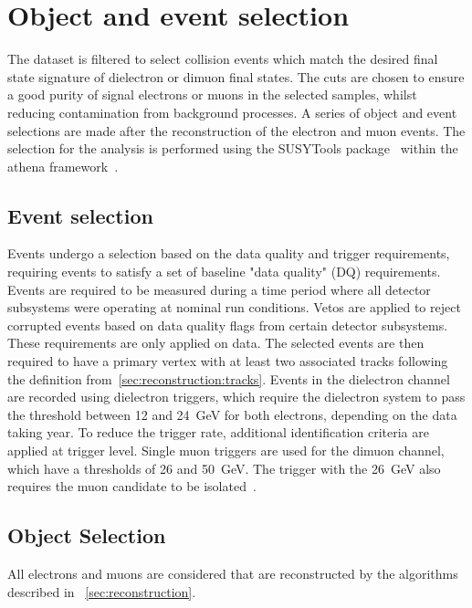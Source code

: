 \chapter{Object and event selection}\label{chap:eventsel}
The dataset is filtered to select collision events which match the desired final state signature of dielectron or dimuon final states. The cuts are chosen to ensure a good purity of signal electrons or muons in the selected samples, whilst reducing contamination from background processes. A series of object and event selections are made after the reconstruction of the electron and muon events. The selection for the analysis is performed using the SUSYTools package~\cite{SUSYTools} within the athena framework~\cite{Athena}.

\section{Event selection}\label{sec:selevent}
Events undergo a selection based on the data quality and trigger requirements, requiring events to satisfy a set of baseline "data quality" (DQ) requirements. Events are required to be measured during a time period where all detector subsystems were operating at nominal run conditions. Vetos are applied to reject corrupted events based on data quality flags from certain detector subsystems. These requirements are only applied on data. The selected events are then required to have a primary vertex with at least two associated tracks following the definition from~\cref{sec:reconstruction:tracks}. Events in the dielectron channel are recorded using dielectron triggers, which require the dielectron system to pass the \et threshold between 12 and \SI{24}{\giga\electronvolt} for both electrons, depending on the data taking year. To reduce the trigger rate, additional identification criteria are applied at trigger level. Single muon triggers are used for the dimuon channel, which have a \pt thresholds of 26 and \SI{50}{\giga\electronvolt}. The trigger with the \SI{26}{\giga\electronvolt} also requires the muon candidate to be isolated~\cite{Aaboud:2016leb}.

\section{Object Selection}\label{sec:selobejct}
All electrons and muons are considered that are reconstructed by the algorithms described in ~\cref{sec:reconstruction}. 

